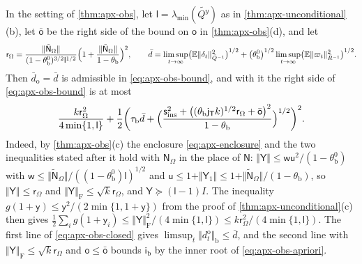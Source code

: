 \begin{remark}\label{rem:apx-obs-order}
In the setting of \cref{thm:apx-obs}, let $\mathsf l=\lambda_{\min}(\tilde{Q^y})$ as in \cref{thm:apx-unconditional}(b), let $\bar{\mathsf o}$ be the right side of the bound on $\mathsf o$ in \cref{thm:apx-obs}(d), and let
\begin{equation*}
\mathsf r_\Omega=\frac{\Vert\tilde{\mathsf N}_\Omega\Vert}{(1-\theta^0_{\mathrm b})^{3/2}\mathsf l^{1/2}}\Bigl(1+\frac{\Vert\tilde{\mathsf N}_\Omega\Vert}{1-\theta_{\mathrm b}}\Bigr)^2,\qquad\bar d=\limsup_{t\to\infty}\bigl(\mathbb{E}\Vert\delta_t\Vert^2_{\bar Q^{-1}}\bigr)^{1/2}+\bigl(\theta^0_{\mathrm b}\bigr)^{1/2}\limsup_{t\to\infty}\bigl(\mathbb{E}\Vert\varpi_t\Vert^2_{\bar R^{-1}}\bigr)^{1/2} .
\end{equation*}
Then $\bar d_{\mathrm o}=\bar d$ is admissible in \eqref{eq:apx-obs-bound}, and with it the right side of \eqref{eq:apx-obs-bound} is at most
\begin{equation}\label{eq:apx-obs-apriori}
\frac{k\mathsf r_\Omega^2}{4\min\{1,\mathsf l\}}+\frac12\biggl(\tau_{\mathrm b}\bar d+\Bigl(\frac{\mathsf s_{\mathrm{ins}}^2+\bigl((\theta_{\mathrm b}\mathsf j_{\mathsf T}k)^{1/2}\mathsf r_\Omega+\bar{\mathsf o}\bigr)^2}{1-\theta_{\mathrm b}}\Bigr)^{1/2}\biggr)^2 .
\end{equation}
Indeed, by \cref{thm:apx-obs}(c) the enclosure \cref{eq:apx-enclosure} and the two inequalities stated after it hold with $\mathsf N_\Omega$ in the place of $\mathsf N$: $\Vert\mathsf Y\Vert\le\mathsf w\mathsf u^2/(1-\theta^0_{\mathrm b})$ with $\mathsf w\le\Vert\tilde{\mathsf N}_\Omega\Vert/((1-\theta^0_{\mathrm b})\mathsf l)^{1/2}$ and $\mathsf u\le1+\Vert\mathsf Y_1\Vert\le1+\Vert\tilde{\mathsf N}_\Omega\Vert/(1-\theta_{\mathrm b})$, so $\Vert\mathsf Y\Vert\le\mathsf r_\Omega$ and $\Vert\mathsf Y\Vert_{\mathrm F}\le\sqrt k\mathsf r_\Omega$, and $\mathsf Y\succeq(\mathsf l-1)I$. The inequality $g(1+\mathsf y)\le\mathsf y^2/(2\min\{1,1+\mathsf y\})$ from the proof of \cref{thm:apx-unconditional}(c) then gives $\frac12\sum_ig(1+\mathsf y_i)\le\Vert\mathsf Y\Vert_{\mathrm F}^2/(4\min\{1,\mathsf l\})\le k\mathsf r_\Omega^2/(4\min\{1,\mathsf l\})$. The first line of \eqref{eq:apx-obs-closed} gives $\limsup_t\Vert d^{\mathrm o}_t\Vert_{\mathrm b}\le\bar d$, and the second line with $\Vert\mathsf Y\Vert_{\mathrm F}\le\sqrt k\mathsf r_\Omega$ and $\mathsf o\le\bar{\mathsf o}$ bounds $\mathsf i_{\mathrm b}$ by the inner root of \eqref{eq:apx-obs-apriori}.


\end{remark}
